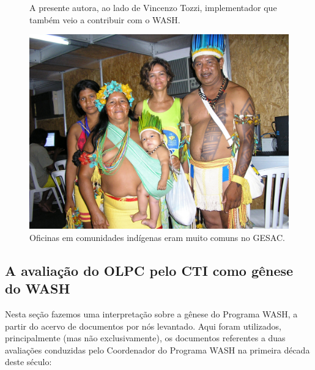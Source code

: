 \documentclass[
12pt,		%
openright,	%
twoside,  %
a4paper,			%
chapter=TITLE,		%
english,			%
french,				%
spanish,			%
brazil				%
]{USPSC-classe/USPSC}
\begin{document}
\begin{figure}[max size={\textwidth}{\textheight}]
\begin{minipage}[b]{0.4\linewidth}
                \caption{A presente autora, ao lado de Vincenzo Tozzi, implementador que tamb\'em veio a contribuir com o WASH.}
                \label{4459669909728990ef00df4bdb6a369f3449704e}
\end{minipage}
\hspace{0.5cm}
\begin{minipage}[b]{0.4\linewidth}
        \centering
                \includegraphics[width=1.0\linewidth]{../../imagens/povo.JPG}
                \caption{Oficinas em comunidades ind\'{i}genas eram muito comuns no GESAC.}
                \label{50c13a4f82feece9e41db915d8e5bc4c5d5094dd}
\end{minipage}%
\hspace{0.5cm}
\end{figure}



\subsection[A avalia\c{c}\~ao do OLPC pelo CTI como g\^enese do WASH]{A avalia\c{c}\~ao do OLPC pelo CTI como g\^enese do WASH}\label{A avalia\c{c}\~ao do OLPC pelo CTI como g\^enese do WASH}
Nesta se\c{c}\~ao fazemos uma interpreta\c{c}\~ao sobre a g\^enese do Programa WASH, a partir do acervo de documentos por n\'os levantado. Aqui foram utilizados, principalmente (mas n\~ao exclusivamente), os documentos referentes a duas avalia\c{c}\~oes conduzidas pelo Coordenador do Programa WASH na primeira d\'ecada deste s\'eculo:
\end{document}
